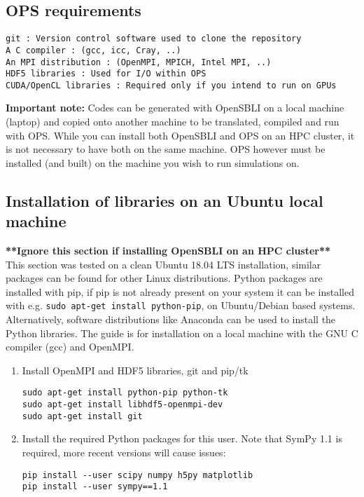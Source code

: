\documentclass[11pt]{article}
\begin{document}
\subsection*{OPS requirements}
\begin{verbatim}
git : Version control software used to clone the repository
A C compiler : (gcc, icc, Cray, ..)
An MPI distribution : (OpenMPI, MPICH, Intel MPI, ..)
HDF5 libraries : Used for I/O within OPS
CUDA/OpenCL libraries : Required only if you intend to run on GPUs
\end{verbatim}
\textbf{Important note:} Codes can be generated with OpenSBLI on a local machine (laptop) and copied onto another machine to be translated, compiled and run with OPS. While you can install both OpenSBLI and OPS on an HPC cluster, it is not necessary to have both on the same machine. OPS however must be installed (and built) on the machine you wish to run simulations on.

\subsection{Installation of libraries on an Ubuntu local machine}\label{sec:libraries}
\textbf{**Ignore this section if installing OpenSBLI on an HPC cluster**}\\
This section was tested on a clean Ubuntu 18.04 LTS installation, similar packages can be found for other Linux distributions. Python packages are installed with pip, if pip is not already present on your system it can be installed with e.g. \verb|sudo apt-get install python-pip|, on Ubuntu/Debian based systems. Alternatively, software distributions like Anaconda can be used to install the Python libraries. The guide is for installation on a local machine with the GNU C compiler (gcc) and OpenMPI.

\begin{enumerate}
\item{Install OpenMPI and HDF5 libraries, git and pip/tk
\begin{verbatim}
sudo apt-get install python-pip python-tk
sudo apt-get install libhdf5-openmpi-dev
sudo apt-get install git
\end{verbatim}}
\item{Install the required Python packages for this user. Note that SymPy 1.1 is required, more recent versions will cause issues:}
\begin{verbatim}
pip install --user scipy numpy h5py matplotlib
pip install --user sympy==1.1
\end{verbatim}

\end{enumerate}
\end{document}
